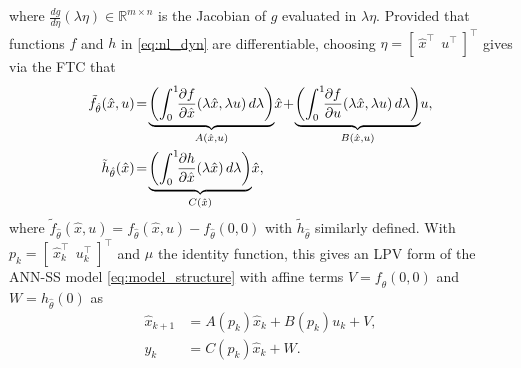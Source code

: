 where $\frac{d g}{d\eta}({\lambda}\eta) \in \mathbb{R}^{m \times n}$ is the Jacobian of $g$ evaluated in ${\lambda}\eta$. Provided that functions $f$ and $h$ in \eqref{eq:nl_dyn} are differentiable, choosing  $\eta=[\
	\hat{x}^\top \ \ u^\top \ ]^\top$ gives via the FTC that
\begin{align}
	\tilde{f}_{\hat \theta}(\hat{x},u) & \!=\!\underbrace{  \left({\int_0^1\!\!\frac{\partial f}{\partial \hat{x}}({\lambda}\hat{x},{\lambda}u)\,d\lambda}\right)}_{{A}(\hat{x},u)}\!\hat{x}\!+\!\underbrace{\left(\int_0^1\!\!\frac{\partial f}{\partial u}({\lambda}\hat{x},{\lambda}u)\,d\lambda\right)}_{{B}(\hat{x},u)}\!u, \notag \\
	\tilde{h}_{\hat \theta}(\hat{x})   & \!=\!\underbrace{\left(\int_0^1\!\!\frac{\partial h}{\partial \hat{x}}({\lambda}\hat{x})\,d\lambda\right)}_{{C}(\hat{x})}\!\hat{x}, \label{eq:abcd_def}                                                                                                                                        %
\end{align}
\vskip -2mm \noindent where $	\tilde{f}_{\hat \theta}(\hat{x},u)=f_{\hat \theta}(\hat{x},u)-	f_{\hat \theta}(0,0)$ with $\tilde{h}_{\hat \theta}$ similarly defined. With $p_k=[\
	\hat{x}_k^\top \ \ u_k^\top \ ]^\top$ and $\mu$ the identity function, this gives an LPV form of the ANN-SS model \eqref{eq:model_structure} with affine terms $V=	f_{\hat \theta}(0,0)$ and  $W=	h_{\hat \theta}(0)$ as
\begin{subequations}
	\label{eq:lpv_model}\begin{align}
		\hat{x}_{k+1} & = A(p_k) \hat{x}_k + B(p_k)  u_k + V, \\
		y_k           & = C(p_k)\hat{x}_k                     %
		+ W.
	\end{align}
\end{subequations}